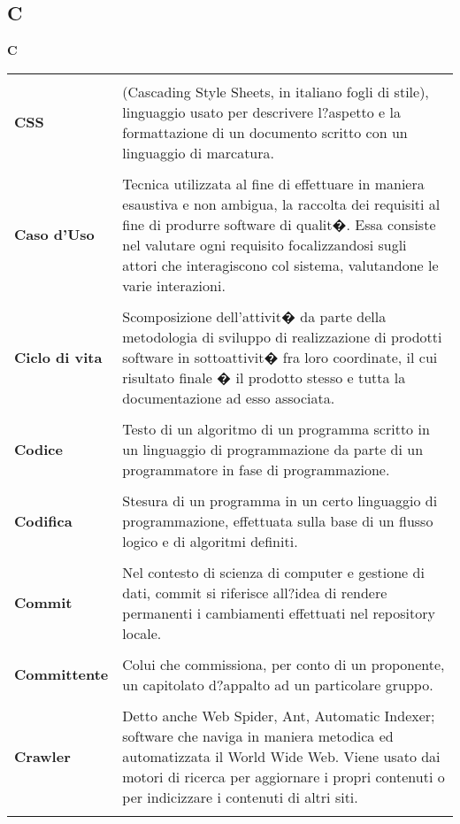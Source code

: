 {\subsection{C} 
\hfill\Huge{\textbf{C}} \\ 
\normalsize 
\begin{longtabu} to 
\toprule \\ 
\textbf{CSS} & (Cascading Style Sheets, in italiano fogli di stile), linguaggio usato per descrivere l?aspetto e la formattazione di un documento scritto con un linguaggio di marcatura. \\ 
 \\ 
\textbf{Caso d'Uso} & Tecnica utilizzata al fine di effettuare in maniera esaustiva e non ambigua, la raccolta dei requisiti al fine di produrre software di qualit�. Essa consiste nel valutare ogni requisito focalizzandosi sugli attori che interagiscono col sistema, valutandone le varie interazioni. \\ 
 \\ 
\textbf{Ciclo di vita} & Scomposizione dell'attivit� da parte della metodologia di sviluppo di realizzazione di prodotti software in sottoattivit� fra loro coordinate, il cui risultato finale � il prodotto stesso e tutta la documentazione ad esso associata. \\ 
 \\ 
\textbf{Codice} & Testo di un algoritmo di un programma scritto in un linguaggio di programmazione da parte di un programmatore in fase di programmazione. \\ 
 \\ 
\textbf{Codifica} & Stesura di un programma in un certo linguaggio di programmazione, effettuata sulla base di un flusso logico e di algoritmi definiti. \\ 
 \\ 
\textbf{Commit} & Nel contesto di scienza di computer e gestione di dati, commit si riferisce all?idea di rendere permanenti i cambiamenti effettuati nel repository locale. \\ 
 \\ 
\textbf{Committente} & Colui che commissiona, per conto di un proponente, un capitolato d?appalto ad un particolare gruppo. \\ 
 \\ 
\textbf{Crawler} & Detto anche Web Spider, Ant, Automatic Indexer; software che naviga in maniera metodica ed automatizzata il World Wide Web. Viene usato dai motori di ricerca per aggiornare i propri contenuti o per indicizzare i contenuti di altri siti. \\ 
 \\ 
\end{longtabu} 
\newpage 
}

